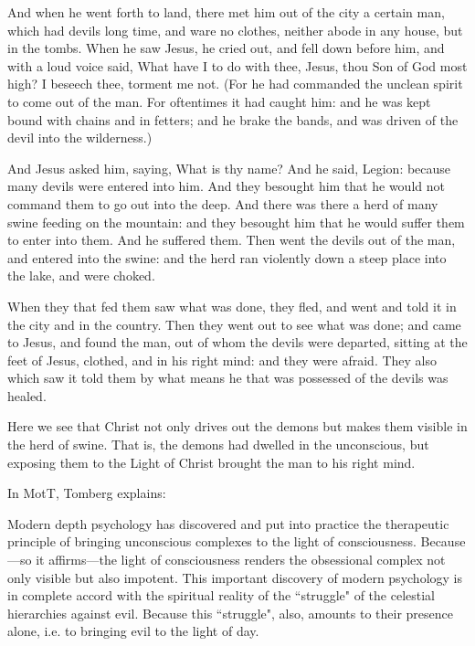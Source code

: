 \begin{quotationx}
And when he went forth to land, there met him out of the city a certain man, which had devils long time, and ware no clothes, neither abode in any house, but in the tombs. When he saw Jesus, he cried out, and fell down before him, and with a loud voice said, What have I to do with thee, Jesus, thou Son of God most high? I beseech thee, torment me not. (For he had commanded the unclean spirit to come out of the man. For oftentimes it had caught him: and he was kept bound with chains and in fetters; and he brake the bands, and was driven of the devil into the wilderness.)

And Jesus asked him, saying, What is thy name? And he said, Legion: because many devils were entered into him. And they besought him that he would not command them to go out into the deep. And there was there a herd of many swine feeding on the mountain: and they besought him that he would suffer them to enter into them. And he suffered them. Then went the devils out of the man, and entered into the swine: and the herd ran violently down a steep place into the lake, and were choked.

When they that fed them saw what was done, they fled, and went and told it in the city and in the country. Then they went out to see what was done; and came to Jesus, and found the man, out of whom the devils were departed, sitting at the feet of Jesus, clothed, and in his right mind: and they were afraid. They also which saw it told them by what means he that was possessed of the devils was healed. 

\end{quotationx}
Here we see that Christ not only drives out the demons but makes them visible in the herd of swine. That is, the demons had dwelled in the unconscious, but exposing them to the Light of Christ brought the man to his right mind.


In MotT, Tomberg explains:


\begin{quotex}
Modern depth psychology has discovered and put into practice the therapeutic principle of bringing unconscious complexes to the light of consciousness. Because—so it affirms—the light of consciousness renders the obsessional complex not only visible but also impotent. This important discovery of modern psychology is in complete accord with the spiritual reality of the ``struggle" of the celestial hierarchies against evil. Because this ``struggle", also, amounts to their presence alone, i.e. to bringing evil to the light of day. 

\end{quotex}

